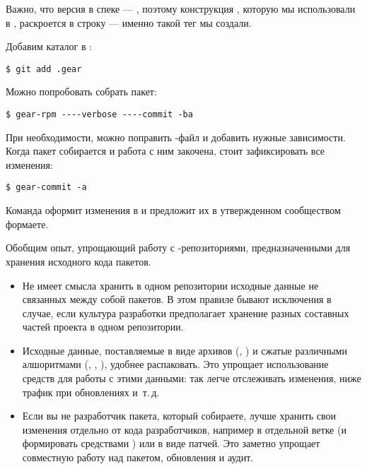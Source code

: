 Важно, что версия в спеке --- , поэтому конструкция ,
которую мы использовали в , раскроется в строку  ---
именно такой тег  мы создали.

Добавим каталог  в :
\begin{verbatim}
$ git add .gear
\end{verbatim}

Можно попробовать собрать пакет:
\begin{verbatim}
$ gear-rpm ----verbose ----commit -ba
\end{verbatim}

При необходимости, можно поправить -файл и добавить нужные зависимости.
Когда пакет собирается и работа с ним закочена, стоит зафиксировать все изменения:
\begin{verbatim}
$ gear-commit -a
\end{verbatim}
Команда оформит изменения в и предложит их в утвержденном сообществом формаете.

Обобщим опыт, упрощающий работу с -репозиториями, предназначенными для хранения исходного кода пакетов.

\begin{itemize}
	\item {}

	Не имеет смысла хранить в одном репозитории исходные данные не связанных между собой пакетов.
		В этом правиле бывают исключения в случае, если культура разработки предполагает хранение
		разных составных частей проекта в одном репозитории.
	\item  {}

	Исходные данные, поставляемые в виде архивов (, ) и сжатые различными
		алшоритмами (, , ), удобнее распаковать. Это упрощает
		использование средств  для работы с этими данными: так легче отслеживать изменения,
		ниже трафик при обновлениях и~т.\,д.
	\item {}

	Если вы не разработчик пакета, который собираете, лучше хранить свои изменения отдельно
		от кода разработчиков, например в отдельной ветке (и формировать  средствами )
		или в виде патчей. Это заметно упрощает совместную работу над пакетом, обновления и аудит.
\end{itemize}
